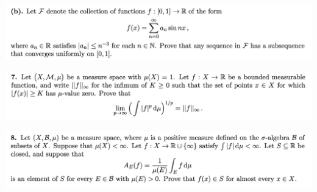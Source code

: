\begin{mdframed}
\includegraphics[width=400pt]{img/analysis--berkeley-202a-final-c7c7.png}
\end{mdframed}

\newpage
\begin{mdframed}
\includegraphics[width=400pt]{img/analysis--berkeley-202a-final-0000.png}
\end{mdframed}

\newpage
\begin{mdframed}
\includegraphics[width=400pt]{img/analysis--berkeley-202a-final-8aed.png}
\end{mdframed}
